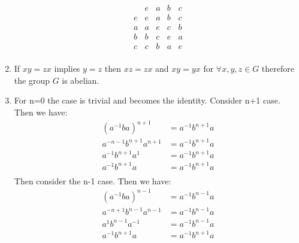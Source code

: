 \documentclass{article}
\begin{document}
\begin{enumerate}
\[
    \begin{array}{l|*{4}{l}}
        & e   & a   & b & c  \\
    \hline
    e & e & a & b & c  \\
    a & a & e & c & b  \\
    b & b & c & e & a\\
    c & c & b & a & e  \\
    \end{array} 
\]
\item
If $xy = zx$ implies $y=z$ then $xz =zx$ and $xy = yx$ for $\forall x,y,z \in G$ therefore the group $G$ is abelian.
\item
For n=0 the case is trivial and becomes the identity. Consider n+1 case. Then we have: 
\begin{equation*}
\begin{split}
(a^{-1}ba)^{n+1} &= a^{-1}b^{n+1}a \\
a^{-n-1}b^{n+1}a^{n+1} &= a^{-1}b^{n+1}a \\
a^{-1}b^{n+1}a^{1} &= a^{-1}b^{n+1}a\\
a^{-1}b^{n+1}a &= a^{-1}b^{n+1}a\\
\end{split}
\end{equation*}
Then consider the n-1 case. Then we have:
\begin{equation*}
\begin{split}
(a^{-1}ba)^{n-1} &= a^{-1}b^{n-1}a\\
a^{-n+1}b^{n-1}a^{n-1} &= a^{-1}b^{n-1}a\\
a^{1}b^{n-1}a^{-1} &= a^{-1}b^{n-1}a\\
a^{-1}b^{n+1}a &= a^{-1}b^{n+1}a\\
\end{split}
\end{equation*}

\end{enumerate}
\end{document}
